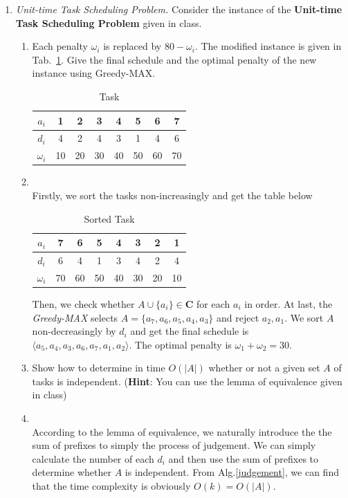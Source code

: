 \documentclass[12pt,a4paper]{article}
\makeatletter
\newtheorem*{solution}{Solution}
\theoremstyle{definition}
\renewenvironment{solution}[1][Solution] {\par\pushQED{\qed}\normalfont\topsep6\p@\@plus6\p@\relax\trivlist\item[\hskip\labelsep\bfseries#1\@addpunct{.}]\ignorespaces}{\popQED\endtrivlist\@endpefalse} \makeatother
\makeatother
\begin{document}
\begin{enumerate}
\begin{enumerate}
\end{enumerate}
\item \textit{Unit-time Task Scheduling Problem.} Consider the instance of the \textbf{Unit-time Task Scheduling Problem} given in class. 
    \begin{enumerate}
        \item Each penalty $\omega_{i}$ is replaced by $80-\omega_{i}$. The modified instance is given in Tab.~\ref{tab:1}. Give the final schedule and the optimal penalty of the new instance using Greedy-MAX.
		\begin{table}[H]
			\setlength{\abovecaptionskip}{0.cm}
			\setlength{\belowcaptionskip}{0.5cm}
			\centering
			\caption{Task}
			\label{tab:1}			
			\begin{tabular}{|c|ccccccc|}
				\hline
				$ a_{i} $&1&2&3&4&5&6&7\\
				\hline
				$ d_{i} $&4&2&4&3&1&4&6\\
                \hline
                $ \omega_{i} $&10&20&30&40&50&60&70\\
				\hline
			\end{tabular}
		\end{table}
	   \begin{solution}
	    ~\\
	    Firstly, we sort the tasks non-increasingly and get the table below
	    \begin{table}[H]
			\setlength{\abovecaptionskip}{0.cm}
			\setlength{\belowcaptionskip}{0.5cm}
			\centering
			\caption{Sorted Task}
			\label{tab:2}			
			\begin{tabular}{|c|ccccccc|}
				\hline
				$ a_{i} $&7&6&5&4&3&2&1\\
				\hline
				$ d_{i} $&6&4&1&3&4&2&4\\
                \hline
                $ \omega_{i} $&70&60&50&40&30&20&10\\
				\hline
			\end{tabular}
		\end{table}
		Then, we check whether $A\cup\{a_i\}\in \mathbf{C}$ for each $a_i$ in order. At last, the \emph{Greedy-MAX} selects $A = \{a_7,a_6,a_5,a_4,a_3\}$ and reject $a_2,a_1$. We sort $A$ non-decreasingly by $d_i$ and get the final schedule is $\langle a_5,a_4,a_3,a_6,a_7,a_1,a_2\rangle$. The optimal penalty is $\omega_1+\omega_2 = 30$.
	   \end{solution}
        \item Show how to determine in time $O(|A|)$ whether or not a given set $A$ of tasks is independent. (\textbf{Hint}: You can use the lemma of equivalence given in class)
 	    \begin{solution}
        ~\\
        According to the lemma of equivalence, we naturally introduce the the sum of prefixes to simply the process of judgement. We can simply calculate the number of each $d_i$ and then use the sum of prefixes to determine whether $A$ is independent. From Alg.\ref{judgement}, we can find that the time complexity is obviously $O(k) = O(|A|)$.
        

\end{solution}
\end{enumerate}
\end{enumerate}
\end{document}
